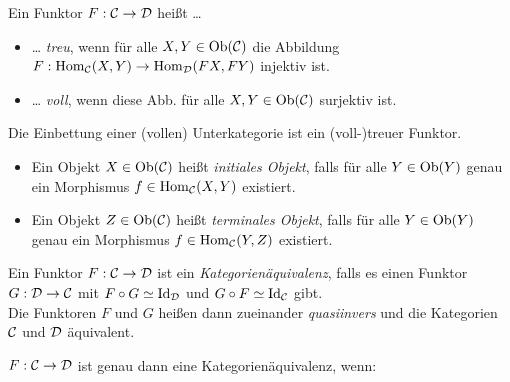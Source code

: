 \documentclass{cheat-sheet}
\begin{document}
\begin{defn}
  Ein Funktor $F : \mathcal{C} \to \mathcal{D}$ heißt \ldots
  \begin{itemize}
    \item \ldots{} \emph{treu}, wenn für alle $X, Y \in \operatorname{Ob}(\mathcal{C})$ die Abbildung
    $F : \operatorname{Hom}_{\mathcal{C}}(X, Y) \to \operatorname{Hom}_{\mathcal{D}}(FX, FY)$
    injektiv ist.
    \item \ldots{} \emph{voll}, wenn diese Abb. für alle $X, Y \in \operatorname{Ob}(\mathcal{C})$ surjektiv ist.
  \end{itemize}
\end{defn}

\begin{bem}
  Die Einbettung einer (vollen) Unterkategorie ist ein (voll-)treuer Funktor.
\end{bem}

\begin{defn}
  \begin{itemize}
    \item Ein Objekt $X \in \operatorname{Ob}(\mathcal{C})$ heißt \emph{initiales Objekt}, falls für alle $Y \in \operatorname{Ob}(Y)$ genau ein Morphismus $f \in \operatorname{Hom}_{\mathcal{C}}(X, Y)$ existiert.
    \item Ein Objekt $Z \in \operatorname{Ob}(\mathcal{C})$ heißt \emph{terminales Objekt}, falls für alle $Y \in \operatorname{Ob}(Y)$ genau ein Morphismus $f \in \operatorname{Hom}_{\mathcal{C}}(Y, Z)$ existiert.
  \end{itemize}
\end{defn}




\begin{defn}
  Ein Funktor $F : \mathcal{C} \to \mathcal{D}$ ist ein \emph{Kategorienäquivalenz}, falls es einen Funktor $G : \mathcal{D} \to \mathcal{C}$ mit $F \circ G \simeq \operatorname{Id}_{\mathcal{D}}$ und $G \circ F \simeq \operatorname{Id}_{\mathcal{C}}$ gibt. \\
  Die Funktoren $F$ und $G$ heißen dann zueinander \emph{quasiinvers} und die Kategorien $\mathcal{C}$ und $\mathcal{D}$ äquivalent.
\end{defn}


\begin{prop}
  $F : \mathcal{C} \to \mathcal{D}$ ist genau dann eine Kategorienäquivalenz, wenn:
   \quad
\end{prop}
\end{document}
